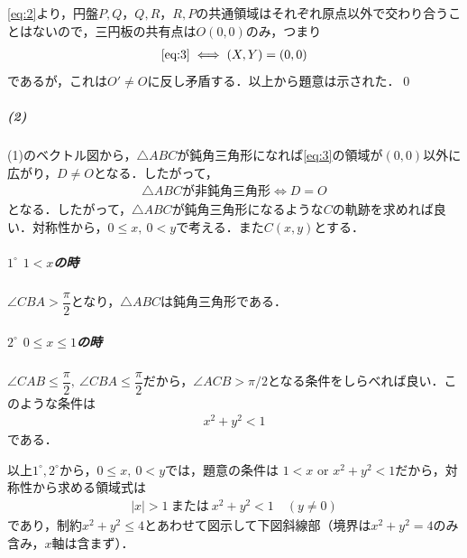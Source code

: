 \documentclass[../../main.tex]{subfiles}
\begin{document}
\cref{eq:2}より，円盤$P,Q$，$Q,R$，$R,P$の共通領域はそれぞれ原点以外で交わり合うことはないので，三円板の共有点は$O(0,0)$のみ，つまり
\begin{align}
  \text{\cref{eq:3}} \iff (X,Y)=(0,0)
\end{align}
であるが，これは$O'\ne O$に反し矛盾する．以上から題意は示された．\qed

\subparagraph{(2)}

(1)のベクトル図から，$\triangle ABC$が鈍角三角形になれば\cref{eq:3}の領域が$(0,0)$以外に広がり，$D\ne O$となる．したがって，
\begin{align}
  \triangle ABC\text{が非鈍角三角形}\iff D=O \label{eq:4}
\end{align}
となる．したがって，$\triangle ABC$が鈍角三角形になるような$C$の軌跡を求めれば良い．対称性から，$0\le x,\ 0<y$で考える．また$C(x,y)$とする．

\subparagraph{$1^\circ$ $1<x$の時}

$\angle CBA>\dfrac{\pi}{2}$となり，$\triangle ABC$は鈍角三角形である．

\subparagraph{$2^\circ$ $0\le x\le1$の時}

$\angle CAB\le\dfrac{\pi}{2},\ \angle CBA\le\dfrac{\pi}{2}$だから，$\angle ACB>\pi/2$となる条件をしらべれば良い．このような条件は
\begin{align}
  x^2+y^2<1
\end{align}
である．
\casesend

以上$1^\circ,2^\circ$から，$0\le x,\ 0<y$では，題意の条件は $1<x$ or $x^2+y^2<1$だから，対称性から求める領域式は
\begin{align}
  |x|>1 \ \text{または}\ x^2+y^2<1 \quad(y\ne0)
\end{align}
であり，制約$x^2+y^2\le4$とあわせて図示して下図斜線部（境界は$x^2+y^2=4$のみ含み，$x$軸は含まず）．
\end{document}
